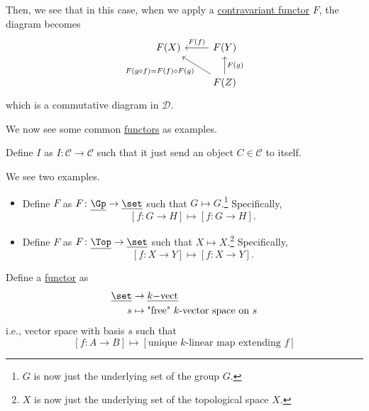 \begin{eg}
	Then, we see that in this case, when we apply a \hyperref[def:contravariant-functor]{contravariant functor} \(F\), the diagram becomes
	\[
		\begin{tikzcd}
			F(X)  & F(Y)\ar[l, "F(f)"']\\
			& F(Z)\ar[lu, "F(g\circ f)=F(f)\circ F(g)"]\ar[u, "F(g)"']
		\end{tikzcd}
	\]
	which is a commutative diagram in \(\mathscr{D}\).
\end{eg}

We now see some common \hyperref[def:functor]{functors} as examples.

\begin{eg}
	Define \(I\) as \(I\colon \mathscr{C} \to \mathscr{C}\) such that it just send an object \(C\in \mathscr{C}\) to itself.
\end{eg}

\begin{eg}\label{eg:forgetful-functor}
	We see two examples.
	\begin{itemize}
		\item Define \(F\) as \(F\colon \underline{\Gp}\to \underline{\set}\) such that \(G\mapsto G\).\footnote{\(G\) is now just the underlying set of the group \(G\).}
		      Specifically,
		      \[
			      \left[f\colon G\to H\right]\mapsto \left[f\colon G\to H\right].
		      \]
		\item Define \(F\) as \(F\colon \underline{\Top}\to \underline{\set}\) such that \(X\mapsto X\).\footnote{\(X\) is now just the underlying set of the topological space \(X\).}
		      Specifically,
		      \[
			      \left[f\colon X\to Y\right]\mapsto \left[f\colon X\to Y\right].
		      \]
	\end{itemize}
\end{eg}

\begin{eg}\label{eg:free-functor}
	Define a \hyperref[def:functor]{functor} as
	\[
		\begin{split}
			\underline{\set} & \to \underline{k\mathrm{-vect}}                   \\
			s                & \mapsto \text{"free" \(k\)-vector space on \(s\)}
		\end{split}
	\]
	i.e., vector space with basis \(s\) such that
	\[
		\left[f\colon A\to B\right]\mapsto \left[\text{unique \(k\)-linear map extending \(f\)}\right]
	\]
\end{eg}

